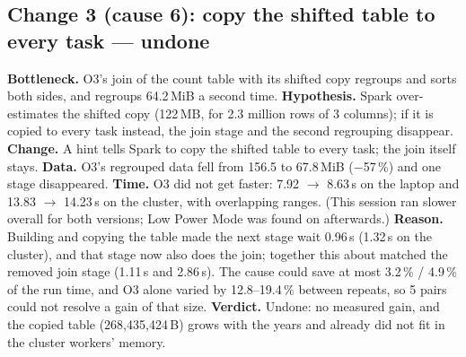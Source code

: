 \documentclass[sigconf]{acmart}
\newcommand{\mib}{\,MiB}
\newcommand{\s}{\,s}
\begin{document}
\subsection{Change 3 (cause 6): copy the shifted table to every task --- undone}
\textbf{Bottleneck.} O3's join of the count table with its shifted copy regroups and sorts both
sides, and regroups 64.2\mib{} a second time. \textbf{Hypothesis.} Spark over-estimates the
shifted copy (122\,MB, for 2.3 million rows of 3 columns); if it is copied to every task
instead, the join stage and the second regrouping disappear. \textbf{Change.} A hint tells
Spark to copy the shifted table to every task; the join itself stays. \textbf{Data.} O3's
regrouped data fell from 156.5 to 67.8\mib{} ($-$57\,\%) and one stage disappeared.
\textbf{Time.} O3 did not get faster: 7.92 $\to$ 8.63\s{} on the laptop and 13.83 $\to$
14.23\s{} on the cluster, with overlapping ranges. (This session ran slower overall for both
versions; Low Power Mode was found on afterwards.) \textbf{Reason.} Building and copying the
table made the next stage wait 0.96\s{} (1.32\s{} on the cluster), and that stage now also does
the join; together this about matched the removed join stage (1.11\s{} and 2.86\s). The cause
could save at most 3.2\,\% / 4.9\,\% of the run time, and O3 alone varied by 12.8--19.4\,\%
between repeats, so 5 pairs could not resolve a gain of that size. \textbf{Verdict.} Undone: no
measured gain, and the copied table (268,435,424\,B) grows with the years and already did not
fit in the cluster workers' memory.
\end{document}
